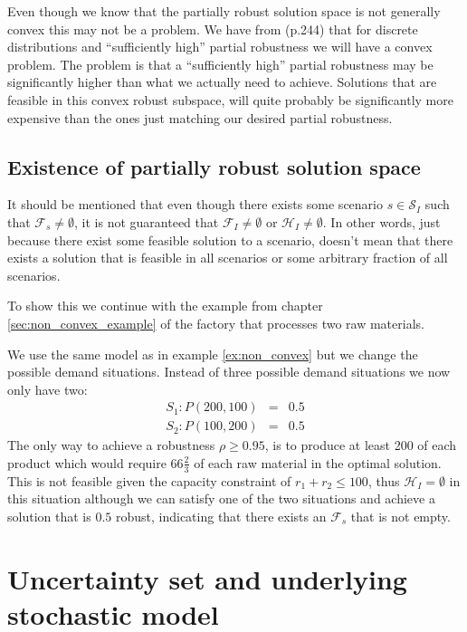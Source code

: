Even though we know that the partially robust solution space is not
generally convex this may not be a problem. We have from
\cite{kallwallace} (p.244) that for discrete distributions and
``sufficiently high'' partial robustness we will have a convex
problem. The problem is that a ``sufficiently high'' partial
robustness may be significantly higher than what we actually need to
achieve. Solutions that are feasible in this convex
robust subspace, will quite probably be significantly more expensive
than the ones just matching our desired partial robustness.

\subsection{Existence of partially robust solution space}
\label{sec:existence_of_robust_subspace}
It should be mentioned that even though there exists some scenario $s
\in \mathcal{S}_I$ such that $\mathcal{F}_s \neq \emptyset$, it is not
guaranteed that $\mathcal{F}_I \neq \emptyset$ or $\mathcal{H}_I \neq
\emptyset$. In other words, just because there exist some feasible
solution to a scenario, doesn't mean that there exists a solution that
is feasible in all scenarios or some arbitrary fraction of all
scenarios.

To show this we continue with the example from chapter
\ref{sec:non_convex_example} of the factory that processes two raw
materials.
\begin{example}
\label{ex:non-existence}
We use the same model as in example \ref{ex:non_convex} but we change
the possible demand situations. Instead of three possible demand
situations we now only have two:
\begin{eqnarray}
S_1: P(200,100) &=& 0.5\\
S_2: P(100,200) &=& 0.5
\end{eqnarray}
The only way to achieve a robustness $\rho \geq 0.95$, is to produce
at least 200 of each product which would require $66\frac23$ of each
raw material in the optimal solution. This is not feasible given the
capacity constraint of $r_1+r_2 \leq 100$, thus $\mathcal{H}_I =
\emptyset$ in this situation although we can satisfy one of the two
situations and achieve a solution that is $0.5$ robust, indicating
that there exists an $\mathcal{F}_s$ that is not empty.
\end{example}

\section{Uncertainty set and underlying stochastic model}
\label{sec:stochasticity}

